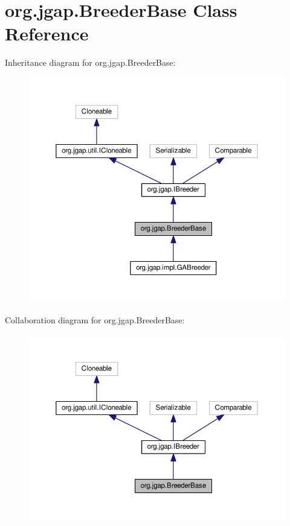 \hypertarget{classorg_1_1jgap_1_1_breeder_base}{\section{org.\-jgap.\-Breeder\-Base Class Reference}
\label{classorg_1_1jgap_1_1_breeder_base}
}


Inheritance diagram for org.\-jgap.\-Breeder\-Base\-:
\nopagebreak
\begin{figure}[H]
\begin{center}
\leavevmode
\includegraphics[width=350pt]{classorg_1_1jgap_1_1_breeder_base__inherit__graph}
\end{center}
\end{figure}


Collaboration diagram for org.\-jgap.\-Breeder\-Base\-:
\nopagebreak
\begin{figure}[H]
\begin{center}
\leavevmode
\includegraphics[width=350pt]{classorg_1_1jgap_1_1_breeder_base__coll__graph}
\end{center}
\end{figure}

